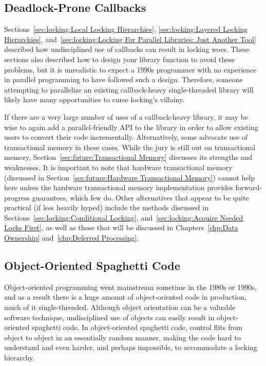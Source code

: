 \subsection{Deadlock-Prone Callbacks}
\label{sec:locking:Deadlock-Prone Callbacks}

Sections~\ref{sec:locking:Local Locking Hierarchies},
\ref{sec:locking:Layered Locking Hierarchies},
and~\ref{sec:locking:Locking For Parallel Libraries: Just Another Tool}
described how undisciplined use of callbacks can result in locking
woes.
These sections also described how to design your library function to
avoid these problems, but it is unrealistic to expect a 1990s programmer
with no experience in parallel programming to have followed such a design.
Therefore, someone attempting to parallelize an existing callback-heavy
single-threaded library will likely have many opportunities to curse
locking's villainy.

If there are a very large number of uses of a callback-heavy library,
it may be wise to again add a parallel-friendly API to the library in
order to allow existing users to convert their code incrementally.
Alternatively, some advocate use of transactional memory in these cases.
While the jury is still out on transactional memory,
Section~\ref{sec:future:Transactional Memory} discusses its strengths and
weaknesses.
It is important to note that hardware transactional memory
(discussed in
Section~\ref{sec:future:Hardware Transactional Memory})
cannot help here unless the hardware transactional memory implementation
provides forward-progress guarantees, which few do.
Other alternatives that appear to be quite practical (if less heavily
hyped) include the methods discussed in
Sections~\ref{sec:locking:Conditional Locking},
and~\ref{sec:locking:Acquire Needed Locks First},
as well as those that will be discussed in
Chapters~\ref{chp:Data Ownership}
and~\ref{chp:Deferred Processing}.

\subsection{Object-Oriented Spaghetti Code}
\label{sec:locking:Object-Oriented Spaghetti Code}

Object-oriented programming went mainstream sometime in the 1980s or
1990s, and as a result there is a huge amount of object-oriented code
in production, much of it single-threaded.
Although object orientation can be a valuable software technique,
undisciplined use of objects can easily result in object-oriented
spaghetti code.
In object-oriented spaghetti code, control flits from object to object
in an essentially random manner, making the code hard to understand
and even harder, and perhaps impossible, to accommodate a locking hierarchy.

